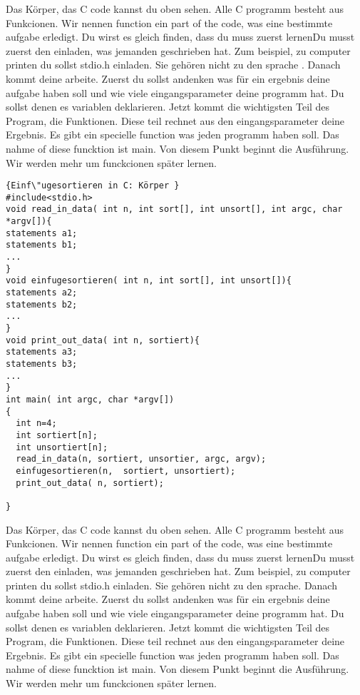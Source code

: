 \documentclass{article}[12pt]
\begin{document}
Das Körper, das C code kannst du oben sehen. Alle C programm besteht aus Funkcionen. Wir nennen function ein part of the code, was eine
bestimmte aufgabe erledigt.
Du wirst es gleich finden, dass du muss zuerst lernenDu musst zuerst den einladen, was jemanden
geschrieben hat. Zum beispiel, zu computer printen du sollst stdio.h einladen. Sie
gehören nicht zu den sprache . Danach kommt deine arbeite. Zuerst du sollst andenken was für ein ergebnis deine aufgabe haben soll und
wie viele eingangsparameter deine programm hat. Du sollst denen es variablen deklarieren. Jetzt kommt die wichtigsten Teil des Program, die
Funktionen. Diese teil rechnet aus den eingangsparameter deine Ergebnis. Es gibt ein specielle function was jeden programm haben
soll. Das nahme of diese funcktion ist main. Von diesem Punkt beginnt die Ausführung. Wir werden mehr um funckcionen später lernen.


\begin{lstlisting}{Einf\"ugesortieren in C: Körper }
#include<stdio.h>
void read_in_data( int n, int sort[], int unsort[], int argc, char *argv[]){
statements a1;
statements b1;
...
}
void einfugesortieren( int n, int sort[], int unsort[]){
statements a2;
statements b2;
...
}
void print_out_data( int n, sortiert){
statements a3;
statements b3;
...
}
int main( int argc, char *argv[])
{
  int n=4;
  int sortiert[n];
  int unsortiert[n];
  read_in_data(n, sortiert, unsortier, argc, argv);
  einfugesortieren(n,  sortiert, unsortiert);
  print_out_data( n, sortiert);

}
\end{lstlisting}
Das Körper, das C code kannst du oben sehen. Alle C programm besteht aus Funkcionen. Wir nennen function ein part of the code, was eine
bestimmte aufgabe erledigt. 
Du wirst es gleich finden, dass du muss zuerst lernenDu musst zuerst den einladen, was jemanden
geschrieben hat. Zum beispiel, zu computer printen du sollst stdio.h einladen. Sie
gehören nicht zu den sprache. Danach kommt deine arbeite. Zuerst du sollst andenken was für ein ergebnis deine aufgabe haben soll und
wie viele eingangsparameter deine programm hat. Du sollst denen es variablen deklarieren. Jetzt kommt die wichtigsten Teil des Program, die
Funktionen. Diese teil rechnet aus den eingangsparameter deine Ergebnis. Es gibt ein specielle function was jeden programm haben
soll. Das nahme of diese funcktion ist main. Von diesem Punkt beginnt die Ausführung. Wir werden mehr um funckcionen später lernen.
 
\end{document}
